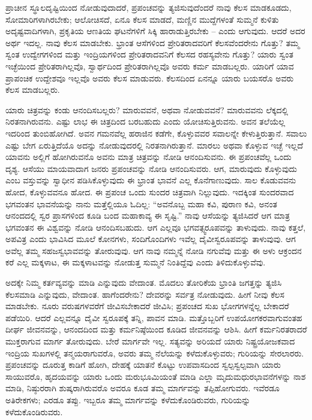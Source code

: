 ಪ್ರಾಚೀನ ಸ್ಥೂಲದೃಷ್ಟಿಯಿಂದ ನೋಡುವುದಾದರೆ, ಪ್ರಪಂಚವನ್ನು ತ್ಯಜಿಸುವುದೆಂದರೆ ನಾವು ಕೆಲಸ ಮಾಡಕೂಡದು, ಸೋಮಾರಿಗಳಾಗಿರಬೇಕು; ಆಲೋಚಿಸದೆ, ಏನೂ ಕೆಲಸ ಮಾಡದೆ, ಮಣ್ಣಿನ ಮುದ್ದೆಗಳಂತೆ ಸುಮ್ಮನೆ ಕುಳಿತು ಅದೃಷ್ಟವಾದಿಗಳಾಗಿ, ಪ್ರಕೃತಿಯ ಆಣತಿಯ ಘಟನೆಗಳಿಗೆ ಸಿಕ್ಕಿ ಹಾರಾಡುತ್ತಿರಬೇಕು – ಎಂದು ಆಗುವುದು. ಆದರೆ ಅದರ ಅರ್ಥ ಇದಲ್ಲ. ನಾವು ಕೆಲಸ ಮಾಡಬೇಕು. ಭ್ರಾಂತ ಆಸೆಗಳಿಂದ ಪ್ರೇರಿತರಾದವರಿಗೆ ಕೆಲಸವೆಂದರೇನು ಗೊತ್ತು? ತಮ್ಮ ಸ್ವಂತ ಉದ್ವೇಗಗಳಿಂದ ಮತ್ತು ಇಂದ್ರಿಯಗಳಿಂದ ಪ್ರೇರಿತರಾದವನಿಗೆ ಕೆಲಸದ ರಹಸ್ಯವೇನು ಗೊತ್ತು? ಯಾರು ಸ್ವಂತ ಇಚ್ಛೆಯಿಂದ ಪ್ರೇರಿತರಾಗಿಲ್ಲವೊ, ಸ್ವಾರ್ಥದಿಂದ ಪ್ರೇರಿತರಾಗಿಲ್ಲವೊ ಅವರು ಕರ್ಮ ಮಾಡಬಲ್ಲರು. ಯಾರಿಗೆ ಯಾವ ಪ್ರಾಪಂಚಿಕ ಉದ್ದೇಶವೂ ಇಲ್ಲವೊ ಅವರು ಕೆಲಸ ಮಾಡುವರು. ಕೆಲಸದಿಂದ ಏನನ್ನೂ ಯಾರು ಬಯಸರೊ ಅವರು ಕೆಲಸ ಮಾಡಬಲ್ಲರು.

ಯಾರು ಚಿತ್ರವನ್ನು ಕಂಡು ಆನಂದಿಸಬಲ್ಲರು? ಮಾರುವವನೆ, ಅಥವಾ ನೋಡುವವನೆ? ಮಾರುವವನು ಲೆಕ್ಕದಲ್ಲಿ ನಿರತನಾಗಿರುವನು. ಎಷ್ಟು ಲಾಭ ಈ ಚಿತ್ರದಿಂದ ಬರಬಹುದು ಎಂದು ಯೋಚಿಸುತ್ತಿರುವನು. ಅವನ ತಲೆಯೆಲ್ಲ ಇದರಿಂದ ತುಂಬಿಹೋಗಿದೆ. ಅವನ ಗಮನವೆಲ್ಲ ಹರಾಜಿನ ಕಡೆಗೇ, ಕೊಳ್ಳುವವರ ಸವಾಲನ್ನೇ ಕೇಳುತ್ತಿರುತ್ತಾನೆ. ಸವಾಲು ಎಷ್ಟು ಬೇಗ ಏರುತ್ತಿದೆಯೊ ಅದನ್ನು ನೋಡುವುದರಲ್ಲಿ ನಿರತನಾಗಿರುತ್ತಾನೆ. ಮಾರಲು ಅಥವಾ ಕೊಳ್ಳುವ ಇಚ್ಛೆ ಇಲ್ಲದೆ ಯಾವನು ಅಲ್ಲಿಗೆ ಹೋಗಿರುವನೊ ಅವನು ಮಾತ್ರ ಚಿತ್ರವನ್ನು ನೋಡಿ ಆನಂದಿಸುವನು. ಈ ಪ್ರಪಂಚವೆಲ್ಲ ಒಂದು ದೃಶ್ಯ. ಆಸೆಯು ಮಾಯವಾದಾಗ ಜನರು ಪ್ರಪಂಚವನ್ನು ನೋಡಿ ಆನಂದಿಸುವರು. ಆಗ, ಮಾರುವುದು ಕೊಳ್ಳುವುದು ಎಂಬ ವಸ್ತುವನ್ನು ಸ್ವಾಧೀನ ಪಡಿಸಿಕೊಳ್ಳುವುದು ಈ ಭ್ರಾಂತ ಭಾವನೆ ಎಲ್ಲ ಕೊನೆಗಾಣುವುದು. ಸಾಲ ಕೊಡುವವನು ಹೋದ, ಕೊಳ್ಳುವವನೂ ಹೋದ. ಈ ಪ್ರಪಂಚ ಒಂದು ಸುಂದರ ಚಿತ್ರವಾಗಿ ನಿಲ್ಲುವುದು. ಇದಕ್ಕಿಂತ ಸುಂದರವಾದ ಭಗವಂತನ ಭಾವನೆಯನ್ನು ನಾನು ಮತ್ತೆಲ್ಲಿಯೂ ಓದಿಲ್ಲ: “ಅವನೊಬ್ಬ ಮಹಾ ಕವಿ, ಪುರಾಣ ಕವಿ, ಅನಂತ ಆನಂದದಲ್ಲಿ ಸ್ವರ ಪ್ರಾಸಗಳಿಂದ ಕೂಡಿ ಬಂದ ಮಹಾಕಾವ್ಯ ಈ ಸೃಷ್ಟಿ.” ನಾವು ಆಸೆಯನ್ನು ತ್ಯಜಿಸಿದರೆ ಆಗ ಮಾತ್ರ ಭಗವಂತನ ಈ ವಿಶ್ವವನ್ನು ನೋಡಿ ಆನಂದಿಸಬಹುದು. ಆಗ ಎಲ್ಲವೂ ಭಗವತ್ಸ್ವರೂಪವನ್ನು ತಾಳುವುದು. ನಾವು ಕತ್ತಲೆ, ಅಪವಿತ್ರ ಎಂದು ಭಾವಿಸಿದ ಮೂಲೆ ಕೋನಗಳು, ಸಂದಿಗೊಂದಿಗಳು ಇವೆಲ್ಲ ದೈವೀಸ್ವರೂಪವನ್ನು ತಾಳುವುವು. ಆಗ ಅವೆಲ್ಲ ತಮ್ಮ ಸಹಜಸ್ವಭಾವವನ್ನು ತೋರುವುವು. ಆಗ ನಾವು ನಮ್ಮನ್ನೆ ನೋಡಿ ನಗುವೆವು ಮತ್ತು ಈ ಅಳು ಆಕ್ರಂದನ ಕರೆ ಎಲ್ಲ ಮಕ್ಕಳಾಟ, ಈ ಮಕ್ಕಳಾಟವನ್ನು ನೋಡುತ್ತ ಸುಮ್ಮನೆ ನಿಂತಿದ್ದೆವು ಎಂದು ತಿಳಿದುಕೊಳ್ಳುವೆವು.

ಅದಕ್ಕೇ ನಿಮ್ಮ ಕರ್ತವ್ಯವನ್ನು ಮಾಡಿ ಎನ್ನುವುದು ವೇದಾಂತ. ಮೊದಲು ತೋರಿಕೆಯ ಭ್ರಾಂತಿ ಜಗತ್ತನ್ನು ತ್ಯಜಿಸಿ ಕೆಲಸಮಾಡಿ ಎನ್ನುವುದು, ವೇದಾಂತ. ಹಾಗೆಂದರೇನು? ದೇವರನ್ನು ಸರ್ವತ್ರ ನೋಡುವುದು. ಹೀಗೆ ನೀವು ಕೆಲಸ ಮಾಡಬೇಕು. ನೂರು ವರುಷಗಳವರೆಗೆ ಜೀವಿಸಬೇಕಾದರೆ ಜೀವಿಸಿ; ಪ್ರಪಂಚದ ಸುಖ ಭೋಗಗಳನ್ನೆಲ್ಲ ಬೇಕಾದರೆ ಪಡೆಯಿರಿ. ಆದರೆ ಎಲ್ಲವನ್ನೂ ದೈವೀ ಸ್ವರೂಪಕ್ಕೆ ತನ್ನಿ, ಪಾವನ ಮಾಡಿ. ಮತ್ತೊಬ್ಬರಿಗೆ ಉಪಯೋಗಕರವಾಗುವಂತಹ ದೀರ್ಘ ಜೀವನವನ್ನು, ಆನಂದದಿಂದ ಮತ್ತು ಕರ್ಮನಿಷ್ಠೆಯಿಂದ ಕೂಡಿದ ಜೀವನವನ್ನು ಆಶಿಸಿ. ಹೀಗೆ ಕರ್ಮನಿರತರಾದರೆ ಮುಕ್ತರಾಗುವ ಮಾರ್ಗ ತೋರುವುದು. ಬೇರೆ ಮಾರ್ಗವೇ ಇಲ್ಲ. ಸತ್ಯವನ್ನು ಅರಿಯದೆ ಯಾರು ನಿಷ್ಟ್ರಯೋಜಕವಾದ ಇಂದ್ರಿಯ ಸುಖಗಳಲ್ಲಿ ತನ್ಮಯರಾಗುವರೊ, ಅವರು ತಮ್ಮ ನೆಲೆಯನ್ನು ಕಳೆದುಕೊಳ್ಳುವರು; ಗುರಿಯನ್ನು ಸೇರಲಾರರು. ಪ್ರಪಂಚವನ್ನು ದೂರುತ್ತ ಕಾಡಿಗೆ ಹೋಗಿ, ದೇಹಕ್ಕೆ ಯಾತನೆ ಕೊಟ್ಟು ಉಪವಾಸದಿಂದ ಸ್ವಲ್ಪಸ್ವಲ್ಪವಾಗಿ ಯಾರು ಸಾಯುವರೊ, ಹೃದಯವನ್ನು ಯಾರು ಒಂದು ಮರುಭೂಮಿಯಂತೆ ಮಾಡಿ ಎಲ್ಲಾ ಮೃದುಮಧುರಭಾವನೆಗಳನ್ನು ನಾಶ ಮಾಡಿ, ನಿಷ್ಠುರರಾಗಿ ಶುಷ್ಕರಾಗಿರುವರೊ ಅವರೂ ಕೂಡ ತಮ್ಮ ಮಾರ್ಗವನ್ನು ತಪ್ಪಿಹೋಗುವರು. ಇವೆರಡೂ ಅತಿರೇಕಗಳು; ಎರಡೂ ತಪ್ಪು. ಇಬ್ಬರೂ ತಮ್ಮ ಮಾರ್ಗವನ್ನು ಕಳೆದುಕೊಂಡಿರುವರು, ಗುರಿಯನ್ನು ಕಳೆದುಕೊಂಡಿರುವರು.

